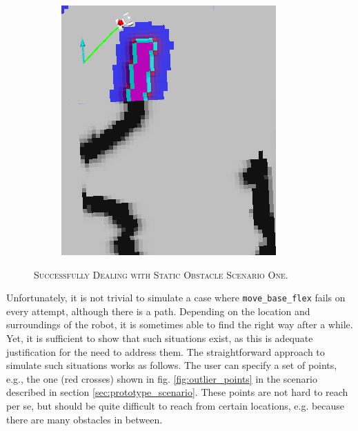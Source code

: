 \documentclass[english, master, utf8]{base/thesis_KBS}
\newcommand{\code}[1]{\colorbox{light-gray}{\texttt{#1}}}
\begin{document}
\begin{figure}[H]
\begin{subfigure}[b]{0.24\textwidth}
        \caption{\textsc{}}
        \label{fig:succ_3}
    \end{subfigure}
    \hfill
    \begin{subfigure}[b]{0.24\textwidth}
        \centering
        \includegraphics[width=\textwidth]{pics/succ_4.png}
        \caption{\textsc{}}
        \label{fig:succ_4}
    \end{subfigure}
\caption{\textsc{Successfully Dealing with Static Obstacle Scenario One.}}
\label{fig:obstacle_success}
\end{figure}
Unfortunately, it is not trivial to
simulate a case where \code{move\_base\_flex} fails on every attempt, although there is a path. Depending on the location and surroundings of the robot, it is sometimes able to find
the right way after a while. Yet, it is sufficient to show that such situations exist, as this is adequate justification for the need to address them. The straightforward approach to
simulate such situations works as follows. The user can specify a set of points, e.g., the one (red crosses) shown in fig. \ref{fig:outlier_points} in the scenario described in section \ref{sec:prototype_scenario}.
These points are not hard to reach per se, but should be quite difficult to reach from certain locations, e.g. because there are many obstacles in between.
\end{document}
